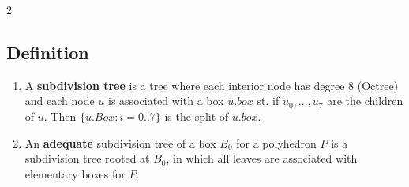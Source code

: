 \documentclass[twoside]{article}
\begin{document}
\begin{multicols}{2}
\subsection{Definition}


\begin{enumerate}
	\item A \textbf{subdivision tree} is a tree where each interior node has degree 8 (Octree) and each node $u$ is associated with a box $u.box$ st. if $u_0,...,u_7$ are the children of $u$. Then $\{u.Box: i = 0..7\}$ is the split of $u.box$.
	\item An \textbf{adequate} subdivision tree of a box $B_0$ for a polyhedron $P$ is a subdivision tree rooted at $B_0$, in which all leaves are associated with elementary boxes for $P$.\\

\end{enumerate}

\begin{comment}
For a given box $B_s$ and a polyhedron $P$, we subdivide $B_s$ recursively and to each subbox $B$ we compute $\Phi^*\ (B, P)$. During the subdivision process, we get the \textbf{subdivision tree(S-Tree)} for $P$ rooted at $B_0$. A subdivision tree is an octree, in which each node keeps the info of $\Phi^*\ (B, P)$.\\



\end{comment}
\end{multicols}
\end{document}
